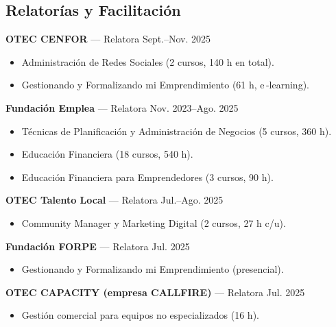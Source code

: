 \documentclass[a4paper,10pt]{article}
\begin{document}
\vspace{0.4em}
\subsection*{Relatorías y Facilitación}
\textbf{OTEC CENFOR} — Relatora \hfill Sept.–Nov. 2025\\[-0.3em]
\begin{itemize}
  \item Administración de Redes Sociales (2 cursos, 140 h en total).
  \item Gestionando y Formalizando mi Emprendimiento (61 h, e\,-learning).
\end{itemize}

\vspace{0.8em}
\textbf{Fundación Emplea} — Relatora \hfill Nov. 2023–Ago. 2025\\[-0.3em]
\begin{itemize}
  \item Técnicas de Planificación y Administración de Negocios (5 cursos, 360 h).
  \item Educación Financiera (18 cursos, 540 h).
  \item Educación Financiera para Emprendedores (3 cursos, 90 h).
\end{itemize}

\vspace{0.8em}
\textbf{OTEC Talento Local} — Relatora \hfill Jul.–Ago. 2025\\[-0.3em]
\begin{itemize}
  \item Community Manager y Marketing Digital (2 cursos, 27 h c/u).
\end{itemize}

\vspace{0.8em}
\textbf{Fundación FORPE} — Relatora \hfill Jul. 2025\\[-0.3em]
\begin{itemize}
  \item Gestionando y Formalizando mi Emprendimiento (presencial).
\end{itemize}

\vspace{0.8em}
\textbf{OTEC CAPACITY (empresa CALLFIRE)} — Relatora \hfill Jul. 2025\\[-0.3em]
\begin{itemize}
  \item Gestión comercial para equipos no especializados (16 h).
\end{itemize}
\end{document}
